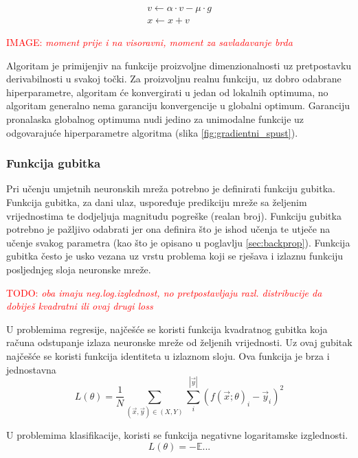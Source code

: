 \documentclass[times, utf8, diplomski]{fer}
\def\expect{\mathbb{E}}
\def\TODO#1{\noindent\textcolor{red}{TODO: \textit{#1}}\newline}
\def\todo#1{\TODO{#1}}
\def\todoimg#1{\begin{center} \textcolor{red}{IMAGE: \textit{#1}} \end{center}}
\begin{document}
\begin{equation}
\label{eq:moment_update}
\begin{split}
v \gets \alpha \cdot v - \mu \cdot g \\
x \gets x + v
\end{split}
\end{equation}

\todoimg{moment prije i na visoravni, moment za savladavanje brda}
\label{fig:visoravan}

Algoritam je primijenjiv na funkcije proizvoljne dimenzionalnosti uz pretpostavku derivabilnosti u svakoj točki. Za proizvoljnu realnu funkciju, uz dobro odabrane hiperparametre, algoritam će konvergirati u jedan od lokalnih optimuma, no algoritam generalno nema garanciju konvergencije u globalni optimum. Garanciju pronalaska globalnog optimuma nudi jedino za unimodalne funkcije uz odgovarajuće hiperparametre algoritma (slika \ref{fig:gradientni_spust}).

\subsubsection{Funkcija gubitka}
Pri učenju umjetnih neuronskih mreža potrebno je definirati funkciju gubitka. Funkcija gubitka, za dani ulaz, uspoređuje predikciju mreže sa željenim vrijednostima te dodjeljuja magnitudu pogreške (realan broj). Funkciju gubitka potrebno je pažljivo odabrati jer ona definira što je ishod učenja te utječe na učenje svakog parametra (kao što je opisano u poglavlju \ref{sec:backprop}). Funkcija gubitka često je usko vezana uz vrstu problema koji se rješava i izlaznu funkciju posljednjeg sloja neuronske mreže.

\todo{oba imaju neg.log.izglednost, no pretpostavljaju razl. distribucije da dobiješ kvadratni ili ovaj drugi loss}

U problemima regresije, najčešće se koristi funkcija kvadratnog gubitka koja računa odstupanje izlaza neuronske mreže od željenih vrijednosti. Uz ovaj gubitak najčešće se koristi funkcija identiteta u izlaznom sloju. Ova funkcija je brza i jednostavna
\begin{equation}
L(\theta) = \frac{1}{N} \sum_{(\vec{x},\vec{y})\in (X,Y)} \sum_{i}^{|\vec{y}|} (f(\vec{x};\theta)_i - \vec{y}_i)^2
\end{equation}

U problemima klasifikacije, koristi se funkcija negativne logaritamske izglednosti. 
\begin{equation}
L(\theta) = -\expect ...
\end{equation}
\end{document}
